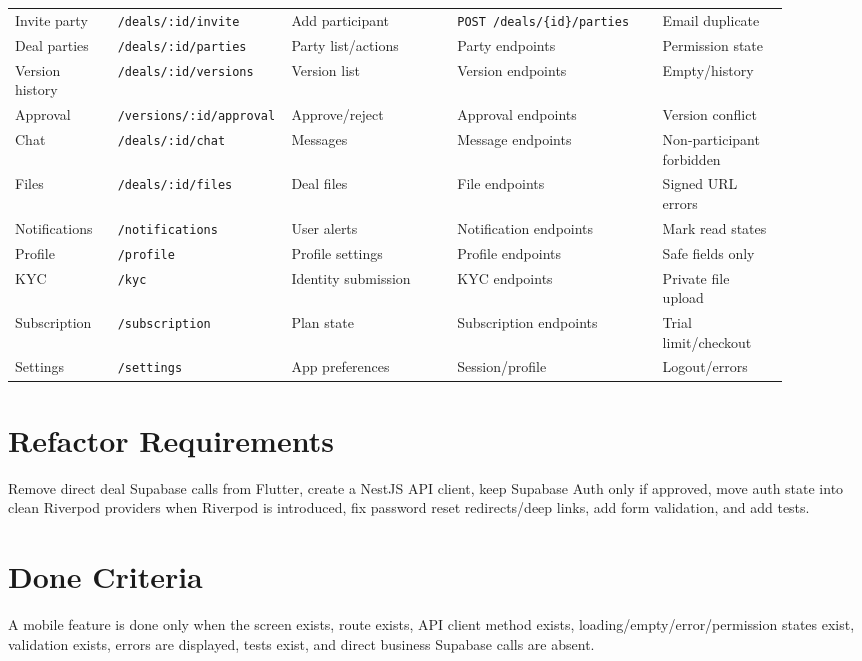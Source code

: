 \begin{longtable}{p{0.13\linewidth}p{0.14\linewidth}p{0.21\linewidth}p{0.26\linewidth}p{0.16\linewidth}}
Invite party & \texttt{/deals/:id/invite} & Add participant & \texttt{POST /deals/\{id\}/parties} & Email duplicate \\
Deal parties & \texttt{/deals/:id/parties} & Party list/actions & Party endpoints & Permission state \\
Version history & \texttt{/deals/:id/versions} & Version list & Version endpoints & Empty/history \\
Approval & \texttt{/versions/:id/approval} & Approve/reject & Approval endpoints & Version conflict \\
Chat & \texttt{/deals/:id/chat} & Messages & Message endpoints & Non-participant forbidden \\
Files & \texttt{/deals/:id/files} & Deal files & File endpoints & Signed URL errors \\
Notifications & \texttt{/notifications} & User alerts & Notification endpoints & Mark read states \\
Profile & \texttt{/profile} & Profile settings & Profile endpoints & Safe fields only \\
KYC & \texttt{/kyc} & Identity submission & KYC endpoints & Private file upload \\
Subscription & \texttt{/subscription} & Plan state & Subscription endpoints & Trial limit/checkout \\
Settings & \texttt{/settings} & App preferences & Session/profile & Logout/errors \\
\bottomrule
\end{longtable}

\section*{Refactor Requirements}
Remove direct deal Supabase calls from Flutter, create a NestJS API client, keep Supabase Auth only if approved, move auth state into clean Riverpod providers when Riverpod is introduced, fix password reset redirects/deep links, add form validation, and add tests.

\section*{Done Criteria}
A mobile feature is done only when the screen exists, route exists, API client method exists, loading/empty/error/permission states exist, validation exists, errors are displayed, tests exist, and direct business Supabase calls are absent.
